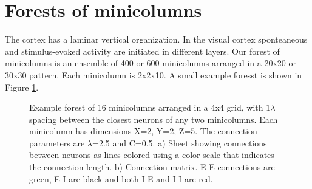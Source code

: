 \section{Forests of minicolumns}
The cortex has a laminar vertical organization.
In the visual cortex sponteaneous and stimulus-evoked activity are initiated in different layers\citep{Sakata2009}.
Our forest of minicolumns is an ensemble of 400 or 600 minicolumns arranged in a 20x20 or 30x30 pattern.
Each minicolumn is 2x2x10.
A small example foresst is shown in Figure \ref{fig:forest_structure}.
\begin{figure}[!htb]
 \caption{ Example forest of 16 minicolumns arranged in a 4x4 grid, with $1\lambda$ spacing between the closest neurons of any two minicolumns. 
              Each minicolumn has dimensions X=2, Y=2, Z=5. The connection parameters are $\lambda$=2.5 and C=0.5. 
          a)  Sheet showing connections between neurons as lines colored using a color scale that indicates the connection length. 
          b)  Connection matrix. E-E connections are green, E-I are black and both I-E and I-I  are red. }
 \label{fig:forest_structure}
\end{figure}
\FloatBarrier

